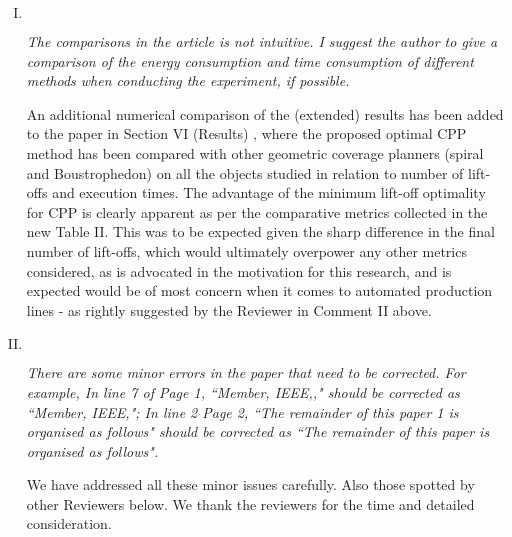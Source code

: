 \documentclass[11pt]{article}
\newenvironment{reviewer}
{\begin{mdframed}[roundcorner = 10pt,fontcolor=blue!70!black]\itshape}
{\end{mdframed}}
\begin{document}
\begin{enumerate}[I.]
  \item $ $
  \begin{reviewer} 
    The comparisons in the article is not intuitive. I suggest the author to give a comparison of the energy consumption and time consumption of different methods when conducting the experiment, if possible.
  \end{reviewer}
  \noindent  An additional numerical comparison of the (extended) results has been added to the paper in Section VI (Results) , where the proposed optimal CPP method has been compared with other geometric coverage planners (spiral and Boustrophedon) on all the objects studied in relation to number of lift-offs and execution times. 
The advantage of the minimum lift-off optimality for CPP is clearly apparent as per the comparative metrics collected in the new Table II. 
This was to be expected given the sharp difference in the final number of lift-offs, which would ultimately overpower any other metrics considered, as is advocated in the motivation for this research, and is expected would be of most concern when it comes to automated production lines - as rightly suggested by the Reviewer in Comment II above.
  
  \item $ $
  \begin{reviewer}
    There are some minor errors in the paper that need to be corrected. For example, In line 7 of Page 1, “Member, IEEE,," should be corrected as “Member, IEEE,"; In line 2 Page 2, “The remainder of this paper 1 is organised as follows" should be corrected as “The remainder of this paper is organised as follows".
  \end{reviewer}
  \noindent We have addressed all these minor issues carefully. Also those spotted by other Reviewers below. We thank the reviewers for the time and detailed consideration.
  

\end{enumerate}
\end{document}
